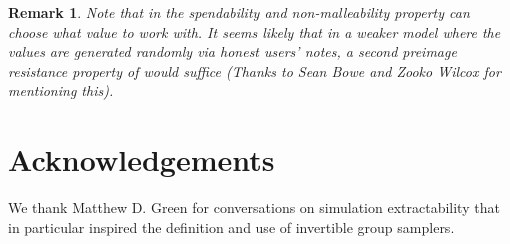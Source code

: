 \documentclass[11pt]{article}
\numberwithin{equation}{section} %
\numberwithin{figure}{section} %
\newtheorem{remark}[thm]{Remark}
\newcommand{\inp}{\ensuremath{\mathsf{inp}}\xspace}
\begin{document}
\begin{remark}
 Note that in the spendability and non-malleability property \adv can choose what value \nf to work with.
 It seems likely that in a weaker model where the values \nf are generated randomly via honest users' notes, a second preimage resistance property of \NF would suffice (Thanks to Sean Bowe and Zooko Wilcox for mentioning this).
\end{remark}





% 
% 
% 
% 
% 
% 
% 
% 
% 
% 




\section*{Acknowledgements}
We thank Matthew D. Green for conversations on simulation extractability that in particular inspired the definition and use of invertible group samplers.


\end{document}

